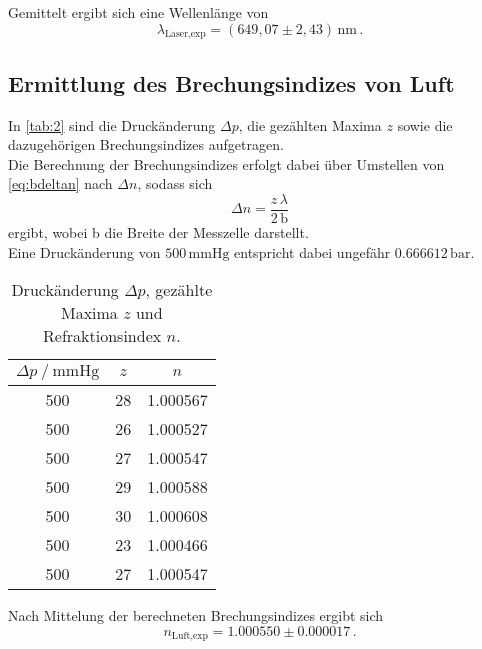 Gemittelt ergibt sich eine Wellenlänge von
\begin{equation*}
    \lambda_\text{Laser,exp} = (649,07 \pm 2,43) \,\si{\nano\meter} \,.
\end{equation*}


\subsection{Ermittlung des Brechungsindizes von Luft}

In \autoref{tab:2} sind die Druckänderung $\Delta p$, die gezählten Maxima $z$ sowie die dazugehörigen Brechungsindizes aufgetragen. \\
Die Berechnung der Brechungsindizes erfolgt dabei über Umstellen von \eqref{eq:bdeltan} nach $\Delta n$, sodass sich
\begin{equation*}
    \Delta n = \dfrac{z \, \lambda}{2 \, \text{b}}
\end{equation*}
ergibt, wobei b die Breite der Messzelle darstellt. \\
Eine Druckänderung von $500 \, \si{\milli\meter} \text{Hg}$ entspricht dabei ungefähr $0.666612 \,\si{\bar}$.

\begin{table}[H]
    \centering
    \caption{Druckänderung $\Delta p$, gezählte Maxima $z$ und Refraktionsindex $n$.}
    \label{tab:1}
    \begin{tabular}{S[table-format=3.0] S[table-format=2.0] S[table-format=1.6]}
      \toprule
    {$\Delta p \mathbin{/} \si{\milli\meter} \text{Hg}$} & {$z$} & {$n$} \\
                &           28          &           1.000567 \\
        500          &           26          &           1.000527 \\
        500          &           27          &           1.000547 \\
        500          &           29          &           1.000588 \\
        500          &           30          &           1.000608 \\
        500          &           23          &           1.000466 \\
        500          &           27          &           1.000547 \\
    \bottomrule
    \end{tabular}
\end{table}

Nach Mittelung der berechneten Brechungsindizes ergibt sich
\begin{equation*}
    n_\text{Luft,exp} = 1.000550 \pm 0.000017 \,.
\end{equation*}


